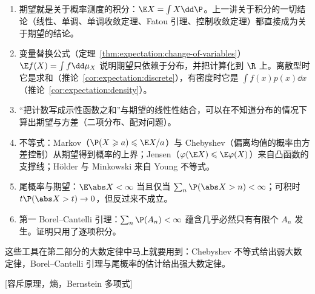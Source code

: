 \begin{enumerate}
\item 期望就是关于概率测度的积分：$\E X=\int X\dd \P$。上一讲关于积分的一切结论（线性、单调、单调收敛定理、Fatou 引理、控制收敛定理）都直接成为关于期望的结论。
\item 变量替换公式（定理~\ref{thm:expectation:change-of-variables}）$\E f(X)=\int f\dd\mu_X$ 说明期望只依赖于分布，并把计算化到 $\R$ 上。离散型时它是求和（推论~\ref{cor:expectation:discrete}），有密度时它是 $\int f(x)p(x)\dd x$（推论~\ref{cor:expectation:density}）。
\item “把计数写成示性函数之和”与期望的线性性结合，可以在不知道分布的情况下算出期望与方差（二项分布、配对问题）。
\item 不等式：Markov（$\P(X\geqslant a)\leqslant \E X/a$）与 Chebyshev（偏离均值的概率由方差控制）从期望得到概率的上界；Jensen（$\varphi(\E X)\leqslant \E\varphi(X)$）来自凸函数的支撑线；Hölder 与 Minkowski 来自 Young 不等式。
\item 尾概率与期望：$\E\abs X<\infty$ 当且仅当 $\sum_n\P(\abs X>n)<\infty$；可积时 $t\P(\abs X>t)\to0$，但反过来不成立。
\item 第一 Borel--Cantelli 引理：$\sum_n\P(A_n)<\infty$ 蕴含几乎必然只有有限个 $A_n$ 发生。证明只用了逐项积分。
\end{enumerate}
这些工具在第二部分的大数定律中马上就要用到：Chebyshev 不等式给出弱大数定律，Borel--Cantelli 引理与尾概率的估计给出强大数定律。

[容斥原理，熵，Bernstein 多项式]
\label{hw:expectation}


